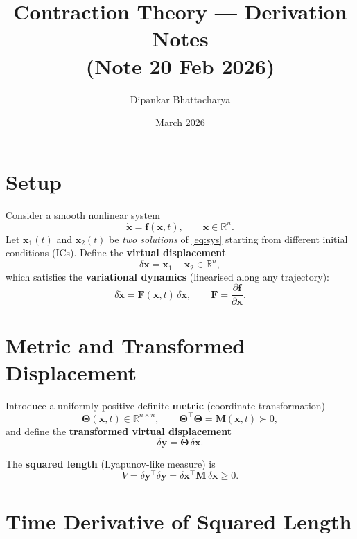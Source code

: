 \documentclass[11pt,a4paper]{article}
\title{\textbf{Contraction Theory --- Derivation Notes}\\
       \large (Note 20 Feb 2026)}
\author{Dipankar Bhattacharya}
\date{March 2026}
\begin{document}
\maketitle
\tableofcontents
\newpage

\section{Setup}

Consider a smooth nonlinear system
\begin{equation}
  \dot{\bm{x}} = \bm{f}(\bm{x}, t), \qquad \bm{x}\in\mathbb{R}^n.
  \label{eq:sys}
\end{equation}
Let $\bm{x}_1(t)$ and $\bm{x}_2(t)$ be \emph{two solutions} of \eqref{eq:sys}
starting from different initial conditions (ICs).
Define the \textbf{virtual displacement}
\[
  \delta\bm{x} = \bm{x}_1 - \bm{x}_2 \in \mathbb{R}^n,
\]
which satisfies the \textbf{variational dynamics} (linearised along any
trajectory):
\begin{equation}
  \delta\dot{\bm{x}} = \bm{F}(\bm{x},t)\,\delta\bm{x},
  \qquad
  \bm{F} = \frac{\partial \bm{f}}{\partial \bm{x}}.
  \label{eq:var}
\end{equation}

\section{Metric and Transformed Displacement}

Introduce a uniformly positive-definite \textbf{metric} (coordinate
transformation)
\[
  \bm{\Theta}(\bm{x},t) \in \mathbb{R}^{n\times n}, 
  \qquad \bm{\Theta}^\top\bm{\Theta} = \bm{M}(\bm{x},t) \succ 0,
\]
and define the \textbf{transformed virtual displacement}
\begin{equation}
  \delta\bm{y} = \bm{\Theta}\,\delta\bm{x}.
  \label{eq:dy}
\end{equation}

The \textbf{squared length} (Lyapunov-like measure) is
\begin{equation}
  V = \delta\bm{y}^\top\delta\bm{y}
    = \delta\bm{x}^\top \bm{M}\,\delta\bm{x} \geq 0.
  \label{eq:V}
\end{equation}

\section{Time Derivative of Squared Length}
\end{document}

